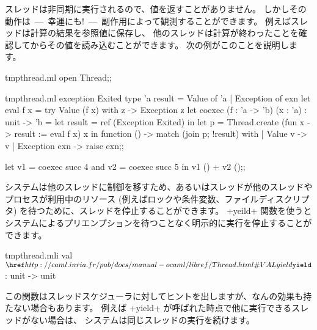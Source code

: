 スレッドは非同期に実行されるので、値を返すことがありません。
しかしその動作は~---~幸運にも!~---~副作用によって観測することができます。
例えばスレッドは計算の結果を参照値に保存し、
他のスレッドは計算が終わったことを確認してからその値を読み込むことができます。
次の例がこのことを説明します。
%
\begin{codefile}{tmpthread.ml}
open Thread;;
\end{codefile}
\begin{listingcodefile}{tmpthread.ml}
exception Exited
type 'a result = Value of 'a | Exception of exn
let eval f x = try Value (f x) with z -> Exception z
let coexec (f : 'a -> 'b) (x : 'a) : unit -> 'b =
  let result = ref (Exception Exited) in
  let p = Thread.create (fun x -> result := eval f x) x in
  function () -> match (join p; !result) with
    | Value v -> v
    | Exception exn -> raise exn;;

let v1 = coexec succ 4 and v2 = coexec succ 5 in v1 () + v2 ();;
\end{listingcodefile}

システムは他のスレッドに制御を移すため、あるいはスレッドが他のスレッドやプロセスが利用中のリソース
(例えばロックや条件変数、ファイルディスクリプタ) を待つために、スレッドを停止することができます。
\ml+yeild+ 関数を使うとシステムによるプリエンプションを待つことなく明示的に実行を停止することができます。
%
\begin{listingcodefile}{tmpthread.mli}
val $\indexlibvalue{Thread}{yield}$ : unit -> unit
\end{listingcodefile}
%
この関数はスレッドスケジューラに対してヒントを出しますが、なんの効果も持たない場合もあります。
例えば \ml+yield+ が呼ばれた時点で他に実行できるスレッドがない場合は、
システムは同じスレッドの実行を続けます。

